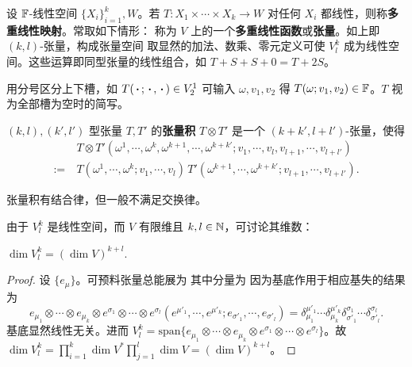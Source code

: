 \begin{definition}
    设 $\mathbb{F}$-线性空间 $\{X_i\}_{i=1}^k,W$。若
    $T:X_1\times\cdots\times X_k\to W$
    对任何 $X_i$ 都线性，则称\textbf{多重线性映射}。常取如下情形：
    称为 $V$ 上的一个\textbf{多重线性函数}或\textbf{张量}。如上即 $(k,l)$-张量，构成张量空间
    取显然的加法、数乘、零元定义可使 $V^k_l$ 成为线性空间。这些运算即同型张量的线性组合，如 $T+ S+S+0=T+2S$。
\end{definition}


\begin{remark}
    用分号区分上下槽，如 $T(\oo;\oo,\oo)\in V^1_2$ 可输入 $\omega,v_1,v_2$ 得 $T(\omega;v_1,v_2)\in\mathbb{F}$。$T$ 视为全部槽为空时的简写。
\end{remark}

\begin{definition}
    $(k,l),(k',l')$ 型张量 $T,T'$ 的\textbf{张量积} $T\otimes T'$ 是一个 $(k+k',l+l')$-张量，使得
\begin{align}
    &T\otimes T'(\omega^1,\cdots,\omega^k,\omega^{k+1},\cdots,\omega^{k+k'};v_1,\cdots,v_l,v_{l+1},\cdots,v_{l+l'})\nonumber\\
    :=\ &T(\omega^1,\cdots,\omega^k;v_1,\cdots,v_l)\,T'(\omega^{k+1},\cdots,\omega^{k+k'};v_{l+1},\cdots,v_{l+l'}).
\end{align}
\end{definition}
\begin{remark}
    张量积有结合律，但一般不满足交换律。
\end{remark}
由于 $V^k_l$ 是线性空间，而 $V$ 有限维且 $k,l\in\mathbb{N}$，可讨论其维数：
\begin{theorem}
    $\dim V^k_l=(\dim V)^{k+l}.$
\end{theorem}
\begin{proof}
    设 $\{e_\mu\}$。可预料张量总能展为
其中分量为
因为基底作用于相应基失的结果为
    \[e_{\mu_1}\otimes\cdots\otimes e_{\mu_k}\otimes e^{\sigma_1}\otimes\cdots\otimes e^{\sigma_l}(e^{\mu'_1},\cdots,e^{\mu'_k};e_{\sigma'_1},\cdots,e_{\sigma'_l})=\delta^{\mu'_1}_{\mu_1}\cdots\delta^{\mu'_k}_{\mu_k}\delta^{\sigma_1}_{\sigma'_1}\cdots\delta^{\sigma_l}_{\sigma'_l}.\]
基底显然线性无关。进而 $V_l^k=\mathrm{span}\{e_{\mu_1}\otimes\cdots\otimes e_{\mu_k}\otimes e^{\sigma_1}\otimes\cdots\otimes e^{\sigma_l}\}$。故 $\dim V_l^k=\prod_{i=1}^k\dim V^*\prod_{j=1}^l\dim V=(\dim V)^{k+l}$。
\end{proof}

